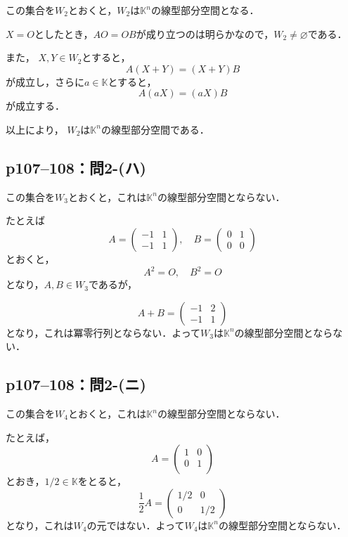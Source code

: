 \documentclass[a4paper,10pt,fleqn]{ltjsarticle}
\begin{document}
\begin{tleftbar}
    この集合を$W_2$とおくと，$W_2$は$\mathbb{K}^n$の線型部分空間となる．

    $X =O$としたとき，$A O = OB$が成り立つのは明らかなので，$ W_2 \ne \varnothing$である．

    また， $X,Y \in W_2$とすると，
    \[
        A(X+Y)=(X+Y)B
    \]
    が成立し，さらに$ a\in \mathbb{K}$とすると，
    \[
        A(aX)=(aX)B
    \]
    が成立する．

    以上により， $W_2$は$\mathbb{K}^n$の線型部分空間である．
\end{tleftbar}

\subsection*{p107--108：問2-(ハ)}

\begin{tleftbar}
    この集合を$W_3$とおくと，これは$\mathbb{K}^n$の線型部分空間とならない．

    たとえば
    \[
        A = \begin{pmatrix} -1 & 1 \\ -1 & 1 \end{pmatrix} , \quad B = \begin{pmatrix} 0 & 1 \\ 0 & 0 \end{pmatrix}
    \]
    とおくと，
    \[
        A^2 = O , \quad B^2 =O
    \]
    となり，$A ,B \in W_3$であるが，

    \[
        A+B = \begin{pmatrix} -1 & 2\\-1 & 1\end{pmatrix}
    \]
    となり，これは冪零行列とならない．よって$W_3$は$\mathbb{K}^n$の線型部分空間とならない．
\end{tleftbar}

\subsection*{p107--108：問2-(ニ)}

\begin{tleftbar}
    この集合を$W_4$とおくと，これは$\mathbb{K}^n$の線型部分空間とならない．

    たとえば，
    \[
        A= \begin{pmatrix} 1 & 0 \\ 0 & 1 \\ \end{pmatrix}
    \]
    とおき，$ 1/2 \in \mathbb{K}$をとると，
    \[
        \frac{1}{2} A = \begin{pmatrix} 1/2 & 0 \\ 0 & 1/2 \end{pmatrix}
    \]
    となり，これは$W_4$の元ではない．よって$W_4$は$\mathbb{K}^n$の線型部分空間とならない．
\end{tleftbar}
\newpage
\end{document}
